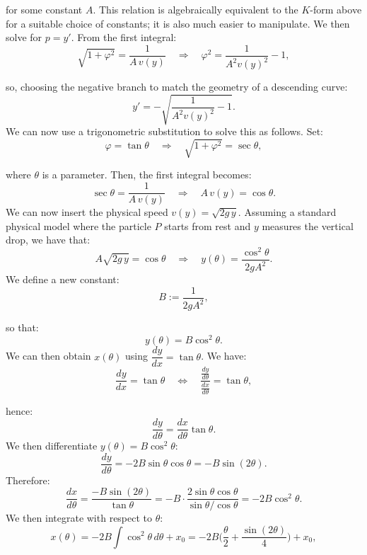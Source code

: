 \documentclass{article}
\begin{document}
for some constant \(A\). This relation is algebraically equivalent to the \(K\)-form above for a suitable choice of constants; it is also much easier to manipulate. We then solve for \(p=y'\).
From the first integral:
\begin{equation}
    \sqrt{1+\varphi^2}=\frac{1}{A\,v(y)} \quad\Longrightarrow\quad \varphi^2=\frac{1}{A^2 v(y)^2}-1,
\end{equation}

so, choosing the negative branch to match the geometry of a descending curve:
\begin{equation}
    y'=-\sqrt{\frac{1}{A^2 v(y)^2}-1}.
\end{equation}
We can now use a trigonometric substitution to solve this as follows. 
Set:
\begin{equation}
    \varphi=\tan\theta \quad\Longrightarrow\quad \sqrt{1+\varphi^2}=\sec\theta,
\end{equation}

where $\theta$ is a parameter. Then, the first integral becomes:
\begin{equation}
    \sec\theta=\frac{1}{A\,v(y)} \quad\Longrightarrow\quad A\,v(y)=\cos\theta.
\end{equation}
We can now insert the physical speed 
\(v(y)=\sqrt{2g\,y}\).
Assuming a standard physical model where the particle $P$ starts from rest and \(y\) measures the vertical drop, we have that:
\begin{equation}
    A\sqrt{2g\,y}=\cos\theta \quad\Longrightarrow\quad
y(\theta)=\frac{\cos^2\theta}{2gA^2}.
\end{equation}
We define a new constant:
\begin{equation}
    B:=\frac{1}{2gA^2},
\end{equation}

so that:
\begin{equation}
    y(\theta)=B\cos^2\theta.
\end{equation}
We can then obtain \(x(\theta)\) using \(\dfrac{dy}{dx}=\tan\theta\).
We have:
\begin{equation}
    \frac{dy}{dx}=\tan\theta \quad\iff\quad
\frac{\frac{dy}{d\theta}}{\frac{dx}{d\theta}}=\tan\theta,
\end{equation}

hence:
\begin{equation}
    \frac{dy}{d\theta}=\frac{dx}{d\theta}{\tan\theta}.
\end{equation}
We then differentiate \(y(\theta)=B\cos^2\theta\):
\begin{equation}
    \frac{dy}{d\theta}=-2B\sin\theta\cos\theta=-B\sin(2\theta).
\end{equation}
Therefore:
\begin{equation}
    \frac{dx}{d\theta}=\frac{-B\sin(2\theta)}{\tan\theta}
= -B\cdot\frac{2\sin\theta\cos\theta}{\sin\theta/\cos\theta}
= -2B\cos^2\theta.
\end{equation}
We then integrate with respect to \(\theta\):
\begin{equation}
    x(\theta)= -2B\int \cos^2\theta\,d\theta + x_0
= -2B\Big(\frac{\theta}{2}+\frac{\sin(2\theta)}{4}\Big)+x_0,
\end{equation}
\end{document}

